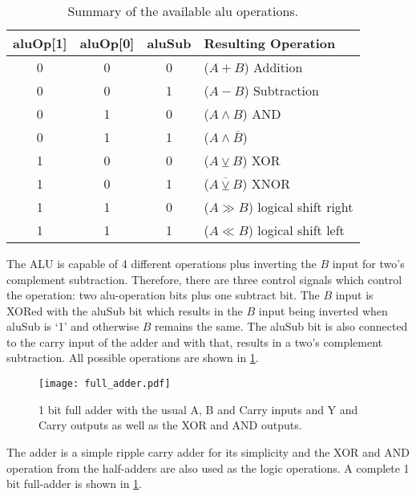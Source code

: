 \subsubsection{}
\begin{table}
  \centering
  \renewcommand{\arraystretch}{1.25}
  \caption{Summary of the available alu operations.}
  \label{tab:aluOp}
  \begin{tabularx}{.8\textwidth}{ |c|c|c||X| }
    \hline
    aluOp[1] & aluOp[0] & aluSub & Resulting Operation             \\\hline\hline
    0        & 0        & 0      & ($A + B$) Addition              \\\hline
    0        & 0        & 1      & ($A - B$) Subtraction           \\\hline
    0        & 1        & 0      & ($A \land B$) AND               \\\hline
    0        & 1        & 1      & ($A \land \overline{B}$)        \\\hline
    1        & 0        & 0      & ($A \veebar B$) XOR             \\\hline
    1        & 0        & 1      & ($\overline{A \veebar B}$) XNOR \\\hline
    1        & 1        & 0      & ($A \gg B$) logical shift right \\\hline
    1        & 1        & 1      & ($A \ll B$) logical shift left  \\\hline
  \end{tabularx}
\end{table}
The \gls{ALU} is capable of 4 different operations plus inverting the $B$ input for two's complement subtraction.
Therefore, there are three control signals which control the operation: two alu-operation bits plus one subtract bit.
The $B$ input is XORed with the aluSub bit which results in the $B$ input being inverted when aluSub is `1' and otherwise $B$ remains the same.
The aluSub bit is also connected to the carry input of the adder and with that, results in a two's complement subtraction.
All possible operations are shown in \cref{tab:aluOp}.
\begin{figure}[t]
  \centering
  \texttt{[image: full\_adder.pdf]}
  \caption{1 bit full adder with the usual A, B and Carry inputs and Y and Carry outputs as well as the XOR and AND outputs.}
  \label{fig:full_adder}
\end{figure}
The adder is a simple ripple carry adder for its simplicity and the XOR and AND operation from the half-adders are also used as the logic operations.
A complete 1 bit full-adder is shown in \cref{fig:full_adder}.

